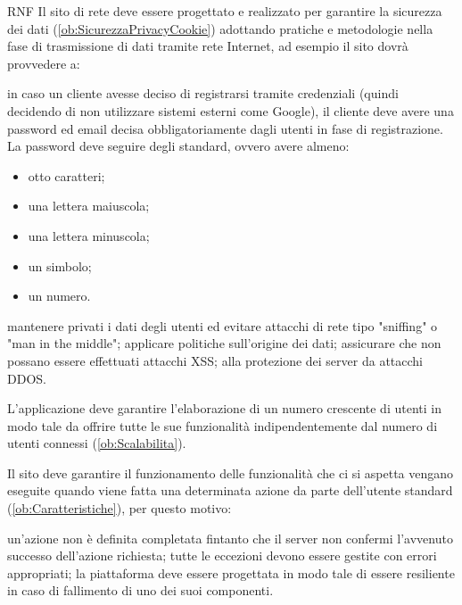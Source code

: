 \begin{listaPersonale}{RNF}
     Il sito di rete deve essere progettato e realizzato per garantire la sicurezza dei dati (\ref{ob:SicurezzaPrivacyCookie}) adottando pratiche e metodologie nella fase di trasmissione di dati tramite rete Internet, ad esempio il sito dovrà provvedere a:
    \begin{listaPersonale2}[RNF]{}
         in caso un cliente avesse deciso di registrarsi tramite credenziali (quindi decidendo di non utilizzare sistemi esterni come Google), il cliente deve avere una password ed email decisa obbligatoriamente dagli utenti in fase di registrazione. La password deve seguire degli standard, ovvero avere almeno:
        \begin{itemize}
            \item otto caratteri;
            \item una lettera maiuscola;
            \item una lettera minuscola;
            \item un simbolo;
            \item un numero.
        \end{itemize}
         mantenere privati i dati degli utenti ed evitare attacchi di rete tipo "sniffing" o "man in the middle";
         applicare politiche sull'origine dei dati;
         assicurare che non possano essere effettuati attacchi XSS;
         alla protezione dei server da attacchi DDOS.
    \end{listaPersonale2}

     L'applicazione deve garantire l'elaborazione di un numero crescente di utenti in modo tale da offrire tutte le sue funzionalità indipendentemente dal numero di utenti connessi (\ref{ob:Scalabilita}).

     Il sito deve garantire il funzionamento delle funzionalità che ci si aspetta vengano eseguite quando viene fatta una determinata azione da parte dell'utente standard (\ref{ob:Caratteristiche}), per questo motivo:
    \begin{listaPersonale2}[RNF]{}
         un'azione non è definita completata fintanto che il server non confermi l'avvenuto successo dell'azione richiesta;
         tutte le eccezioni devono essere gestite con errori appropriati;
         la piattaforma deve essere progettata in modo tale di essere resiliente in caso di fallimento di uno dei suoi componenti.
    \end{listaPersonale2}


\end{listaPersonale}
